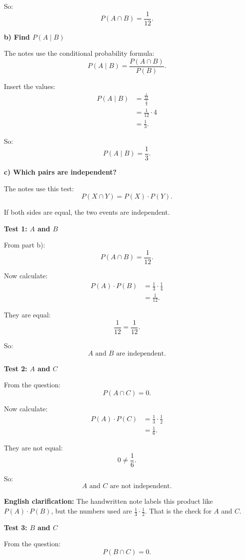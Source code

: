\documentclass[10pt]{article}
\begin{document}
So:
\[
P(A\cap B)=\frac{1}{12}.
\]

\textbf{b) Find \(P(A\mid B)\)}

The notes use the conditional probability formula:
\[
P(A\mid B)
=
\frac{P(A\cap B)}{P(B)}.
\]

Insert the values:
\begin{align*}
P(A\mid B)
&=
\frac{\frac{1}{12}}{\frac{1}{4}}
\\[2mm]
&=
\frac{1}{12}\cdot 4
\\[2mm]
&=
\frac{1}{3}.
\end{align*}

So:
\[
P(A\mid B)=\frac{1}{3}.
\]

\textbf{c) Which pairs are independent?}

The notes use this test:
\[
P(X\cap Y)
=
P(X)\cdot P(Y).
\]

If both sides are equal, the two events are
independent.

\textbf{Test 1: \(A\) and \(B\)}

From part b):
\[
P(A\cap B)=\frac{1}{12}.
\]

Now calculate:
\begin{align*}
P(A)\cdot P(B)
&=
\frac{1}{3}\cdot\frac{1}{4}
\\[2mm]
&=
\frac{1}{12}.
\end{align*}

They are equal:
\[
\frac{1}{12}=\frac{1}{12}.
\]

So:
\[
A \text{ and } B
\text{ are independent.}
\]

\textbf{Test 2: \(A\) and \(C\)}

From the question:
\[
P(A\cap C)=0.
\]

Now calculate:
\begin{align*}
P(A)\cdot P(C)
&=
\frac{1}{3}\cdot\frac{1}{2}
\\[2mm]
&=
\frac{1}{6}.
\end{align*}

They are not equal:
\[
0\ne \frac{1}{6}.
\]

So:
\[
A \text{ and } C
\text{ are not independent.}
\]

\textbf{English clarification:}
The handwritten note labels this product like
\(P(A)\cdot P(B)\), but the numbers used are
\(\frac13\cdot\frac12\). That is the check for
\(A\) and \(C\).

\textbf{Test 3: \(B\) and \(C\)}

From the question:
\[
P(B\cap C)=0.
\]
\end{document}
